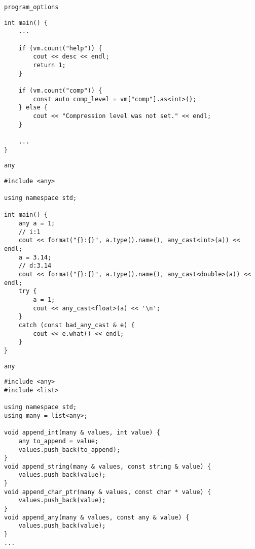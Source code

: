 \documentclass{beamer}
\begin{document}
\begin{frame}[fragile]{{\tt program\_options}}
\small
\begin{lstlisting}
int main() {
    ...  

    if (vm.count("help")) {
        cout << desc << endl;
        return 1;
    }
    
    if (vm.count("comp")) {
        const auto comp_level = vm["comp"].as<int>();
    } else {
        cout << "Compression level was not set." << endl;
    }

    ...
}
\end{lstlisting}
\end{frame}

\begin{frame}[fragile]{{\tt any}}
\small
\begin{lstlisting}
#include <any>

using namespace std;

int main() {
    any a = 1;
    // i:1
    cout << format("{}:{}", a.type().name(), any_cast<int>(a)) << endl;
    a = 3.14;
    // d:3.14
    cout << format("{}:{}", a.type().name(), any_cast<double>(a)) << endl;
    try {
        a = 1;
        cout << any_cast<float>(a) << '\n';
    }
    catch (const bad_any_cast & e) {
        cout << e.what() << endl;
    }
}
\end{lstlisting}
\end{frame}

\begin{frame}[fragile]{{\tt any}}
\small
\begin{lstlisting}
#include <any>
#include <list>

using namespace std;
using many = list<any>;

void append_int(many & values, int value) {
    any to_append = value;
    values.push_back(to_append);
}
void append_string(many & values, const string & value) {
    values.push_back(value);
}
void append_char_ptr(many & values, const char * value) {
    values.push_back(value);
}
void append_any(many & values, const any & value) {
    values.push_back(value);
}
...
\end{lstlisting}
\end{frame}
\end{document}
